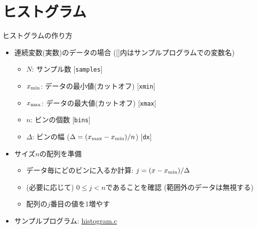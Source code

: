 \section{ヒストグラム}

\begin{frame}[t,fragile]{ヒストグラムの作り方}
  \begin{itemize}
    \setlength{\itemsep}{1em}
  \item 連続変数(実数)のデータの場合 ([]内はサンプルプログラムでの変数名)
    \begin{itemize}
    \item $N$: サンプル数 [{\tt samples}]
    \item $x_{\rm min}$: データの最小値(カットオフ) [{\tt xmin}]
    \item $x_{\rm max}$: データの最大値(カットオフ) [{\tt xmax}]
    \item $n$: ビンの個数 [{\tt bins}]
    \item $\Delta$: ビンの幅 ($\Delta=(x_{\rm max}-x_{\rm min}) / n$) [{\tt dx}]
    \end{itemize}
  \item サイズ$n$の配列を準備
    \begin{itemize}
    \item データ毎にどのビンに入るか計算: $j = (x - x_{\rm min}) / \Delta$
    \item (必要に応じて) $0 \le j < n$であることを確認 (範囲外のデータは無視する)
    \item 配列の$j$番目の値を1増やす
    \end{itemize}
    \item サンプルプログラム: \href{https://github.com/todo-group/computer-experiments/blob/master/exercise/monte_carlo/histogram.c}{histogram.c}
  \end{itemize}
\end{frame}

